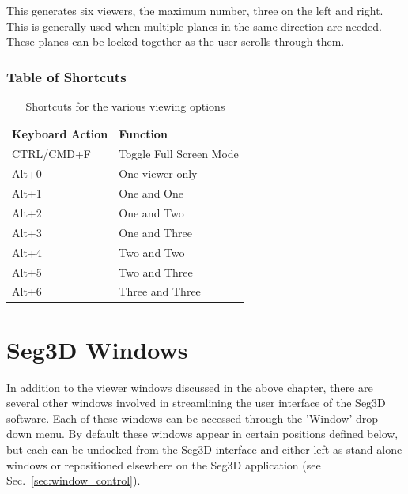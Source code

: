 \documentclass[fleqn,11pt,openany]{book}
\begin{document}
This generates six viewers, the maximum number, three on the left and right.
This is generally used when multiple planes in the same direction are needed.
These planes can be locked together as the user scrolls through them.  

\subsection{Table of Shortcuts}

\begin{table}[h!]
\label{tab:viewerkey}
\caption{Shortcuts for the various viewing options}
\begin{tabular}{|l|l|}
\hline
{\bf Keyboard Action} & {\bf Function}\\
\hline
CTRL/CMD+F & Toggle Full Screen Mode\\
\hline
Alt+0 & One viewer only\\
\hline
Alt+1 & One and One\\
\hline
Alt+2 & One and Two\\
\hline
Alt+3 & One and Three\\
\hline
Alt+4 & Two and Two\\
\hline
Alt+5 & Two and Three\\
\hline
Alt+6 & Three and Three\\
\hline
\end{tabular}
\end{table}




\chapter{Seg3D Windows}
\label{sec:windows}

\begin{introduction}
In addition to the viewer windows discussed in the above chapter, there are several other
 windows involved in streamlining the user interface of the Seg3D software.  
 Each of these windows can be accessed through the 'Window' drop-down menu.
 By default these windows appear in certain positions defined below, but each can be undocked
 from the Seg3D interface and either left as stand alone windows or repositioned elsewhere on
 the Seg3D application (see Sec.~\ref{sec:window_control}).  
\end{introduction}
\end{document}

